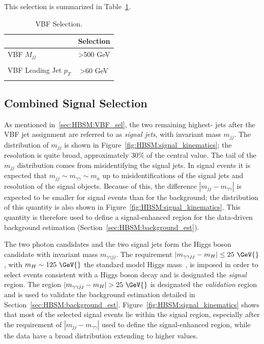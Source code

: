 This selection is summarized in Table~\ref{tab:HBSM:VBF_selection}.
\begin{table}[htbp]
  \begin{center}
  \caption{VBF Selection.}
  \label{tab:HBSM:VBF_selection}
    {\footnotesize
  \begin{tabular}{ l c }
    \toprule
    & Selection \\
    \midrule
    VBF $M_{jj}$ & >500 GeV \\
    \\
    VBF Leading Jet $p_T$  & >60 GeV \\
    \\ 
    \bottomrule
  \end{tabular}
    }
  \end{center}
\end{table}

\subsection{Combined Signal Selection}
\label{sec:HBSM:signal_selection}
As mentioned in~\ref{sec:HBSM:VBF_sel}, the two remaining highest-\pt{} jets after the VBF jet assignment are referred to as \textit{signal jets}, with invariant mass $m_{jj}$.
The distribution of $m_{jj}$ is shown in Figure~\ref{fig:HBSM:signal_kinematics}; the resolution is quite broad, approximately 30\% of the central value.
The tail of the $m_{jj}$ distribution comes from misidentifying the signal jets.
In signal events it is expected that $m_{jj}\sim m_{\gamma\gamma} \sim m_a$ up to misidentifications of the signal jets and resolution of the signal objects.
Because of this, the difference $|m_{jj}-m_{\gamma\gamma}|$ is expected to be smaller for signal events than for the background; the distribution of this quantity is also shown in Figure~\ref{fig:HBSM:signal_kinematics}.
This quantity is therefore used to define a signal-enhanced region for the data-driven background estimation (Section~\ref{sec:HBSM:background_est}).

The two photon candidates and the two signal jets form the Higgs boson candidate with invariant mass $m_{\gamma\gamma jj}$.
The requirement $|m_{\gamma\gamma jj}-m_H| \le 25~\GeV{}$, with $m_H\sim125~\GeV{}$ the standard model Higgs mass~\cite{PDG}, is imposed in order to select events consistent with a Higgs boson decay and is designated the \textit{signal} region.
The region $|m_{\gamma\gamma jj} - m_H| > 25~\GeV{}$ is designated the \textit{validation} region and is used to validate the background estimation detailed in Section~\ref{sec:HBSM:background_est}.
Figure~\ref{fig:HBSM:signal_kinematics} shows that most of the selected signal events lie within the signal region, especially after the requirement of $|m_{jj}-m_{\gamma\gamma}|$ used to define the signal-enhanced region,
while the data have a broad distribution extending to higher values.

